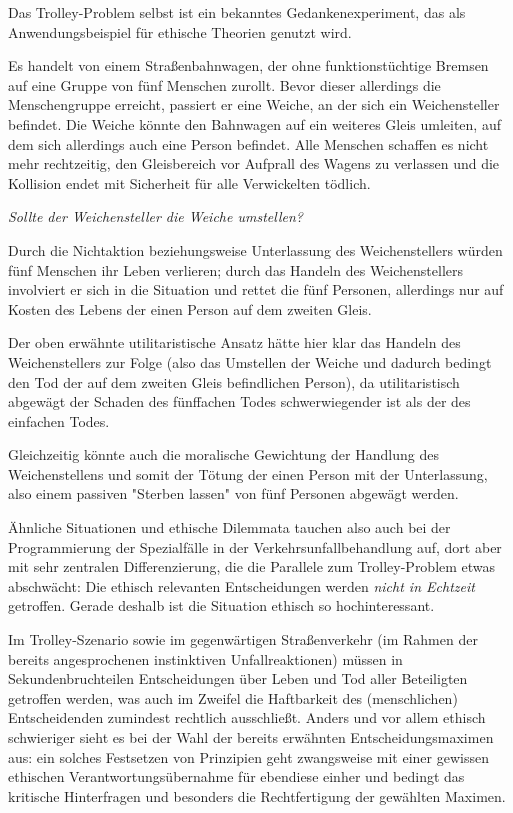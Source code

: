 \documentclass[twocolumn, german]{tum-article}
\begin{document}
Das Trolley-Problem selbst ist ein bekanntes Gedankenexperiment, das als Anwendungsbeispiel für ethische Theorien genutzt wird.

Es handelt von einem Straßenbahnwagen, der ohne funktionstüchtige Bremsen auf eine Gruppe von fünf Menschen zurollt.
Bevor dieser allerdings die Menschengruppe erreicht, passiert er eine Weiche, an der sich ein Weichensteller befindet.
Die Weiche könnte den Bahnwagen auf ein weiteres Gleis umleiten, auf dem sich allerdings auch eine Person befindet.
Alle Menschen schaffen es nicht mehr rechtzeitig, den Gleisbereich vor Aufprall des Wagens zu verlassen und die Kollision endet mit Sicherheit für alle Verwickelten tödlich.

\emph{Sollte der Weichensteller die Weiche umstellen?}

Durch die Nichtaktion beziehungsweise Unterlassung des Weichenstellers würden fünf Menschen ihr Leben verlieren; durch das Handeln des Weichenstellers involviert er sich in die Situation und rettet die fünf Personen, allerdings nur auf Kosten des Lebens der einen Person auf dem zweiten Gleis.

Der oben erwähnte utilitaristische Ansatz hätte hier klar das Handeln des Weichenstellers zur Folge (also das Umstellen der Weiche und dadurch bedingt den Tod der auf dem zweiten Gleis befindlichen Person), da utilitaristisch abgewägt der Schaden des fünffachen Todes schwerwiegender ist als der des einfachen Todes.

Gleichzeitig könnte auch die moralische Gewichtung der Handlung des Weichenstellens und somit der Tötung der einen Person mit der Unterlassung, also einem passiven "Sterben lassen" von fünf Personen abgewägt werden.

Ähnliche Situationen und ethische Dilemmata tauchen also auch bei der Programmierung der Spezialfälle in der Verkehrsunfallbehandlung auf, dort aber mit sehr zentralen Differenzierung, die die Parallele zum Trolley-Problem etwas abschwächt:
Die ethisch relevanten Entscheidungen werden \textit{nicht in Echtzeit} getroffen. Gerade deshalb ist die Situation ethisch so hochinteressant.

Im Trolley-Szenario sowie im gegenwärtigen Straßenverkehr (im Rahmen der bereits angesprochenen instinktiven Unfallreaktionen) müssen in Sekundenbruchteilen Entscheidungen über Leben und Tod aller Beteiligten getroffen werden, was auch im Zweifel die Haftbarkeit des (menschlichen) Entscheidenden zumindest rechtlich ausschließt.
Anders und vor allem ethisch schwieriger sieht es bei der Wahl der bereits erwähnten Entscheidungsmaximen aus: ein solches Festsetzen von Prinzipien geht zwangsweise mit einer gewissen ethischen Verantwortungsübernahme für ebendiese einher und bedingt das kritische Hinterfragen und besonders die Rechtfertigung der gewählten Maximen.
\end{document}
